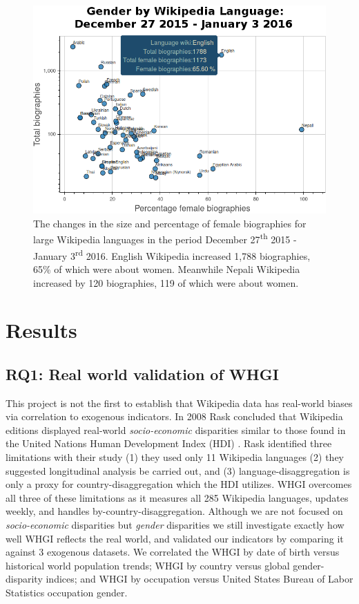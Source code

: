 \documentclass{sig-alternate-05-2015}
\begin{document}
\begin{figure}
\includegraphics[width=\columnwidth]{figures/genderbylang.png} 
\caption{The changes in the size and percentage of female biographies for large Wikipedia languages in the period December 27\textsuperscript{th} 2015 - January 3\textsuperscript{rd} 2016. English Wikipedia increased 1,788 biographies, 65\% of which were about women. Meanwhile Nepali Wikipedia increased by 120 biographies, 119 of which were about women.}
\label{fig:genderbylang}
\end{figure}


\section{Results}
\subsection{RQ1: Real world validation of WHGI}
This project is not the first to establish that Wikipedia data has real-world biases via correlation to exogenous indicators. In 2008 Rask concluded that Wikipedia editions displayed real-world \textit{socio-economic} disparities similar to those found in the United Nations Human Development Index (HDI) \cite{rask_reach_2008}. Rask identified three limitations with their study (1) they used only 11 Wikipedia languages (2) they suggested longitudinal analysis be carried out, and (3) language-disaggregation is only a proxy for country-disaggregation which the HDI utilizes. WHGI overcomes all three of these limitations as it measures all 285 Wikipedia languages, updates weekly, and handles by-country-disaggregation. Although we are not focused on \textit{socio-economic} disparities but \textit{gender} disparities we still investigate exactly how well WHGI reflects the real world, and validated our indicators by comparing it against 3 exogenous datasets. We correlated the WHGI by date of birth versus historical world population trends; WHGI by country versus global gender-disparity indices; and WHGI by occupation versus United States Bureau of Labor Statistics occupation gender.
\end{document}
